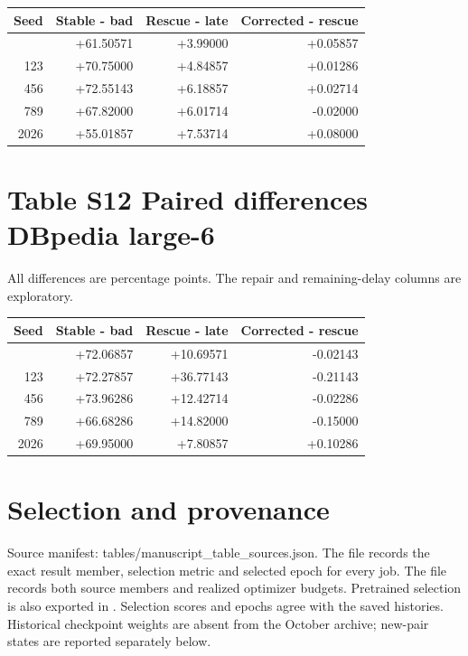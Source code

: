 \documentclass[11pt,a4paper]{article}
\begin{document}
\begin{longtable}[]{@{}rrrr@{}}
\toprule\noalign{}
Seed & Stable - bad & Rescue - late & Corrected - rescue \\
\midrule\noalign{}
\endhead
\bottomrule\noalign{}
\endlastfoot
42 & +61.50571 & +3.99000 & +0.05857 \\
123 & +70.75000 & +4.84857 & +0.01286 \\
456 & +72.55143 & +6.18857 & +0.02714 \\
789 & +67.82000 & +6.01714 & -0.02000 \\
2026 & +55.01857 & +7.53714 & +0.08000 \\
\end{longtable}


\section{Table S12 Paired differences DBpedia large-6}\label{table-s12-paired-differences-dbpedia-large-6}

All differences are percentage points. The repair and remaining-delay columns are exploratory.

\begin{longtable}[]{@{}rrrr@{}}
\toprule\noalign{}
Seed & Stable - bad & Rescue - late & Corrected - rescue \\
\midrule\noalign{}
\endhead
\bottomrule\noalign{}
\endlastfoot
42 & +72.06857 & +10.69571 & -0.02143 \\
123 & +72.27857 & +36.77143 & -0.21143 \\
456 & +73.96286 & +12.42714 & -0.02286 \\
789 & +66.68286 & +14.82000 & -0.15000 \\
2026 & +69.95000 & +7.80857 & +0.10286 \\
\end{longtable}

\section{Selection and provenance}\label{selection-and-provenance}

Source manifest: tables/manuscript\_table\_sources.json. The  file records the exact result member, selection metric and selected epoch for every job. The  file records both source members and realized optimizer budgets. Pretrained selection is also exported in . Selection scores and epochs agree with the saved histories. Historical checkpoint weights are absent from the October archive; new-pair states are reported separately below.
\end{document}
